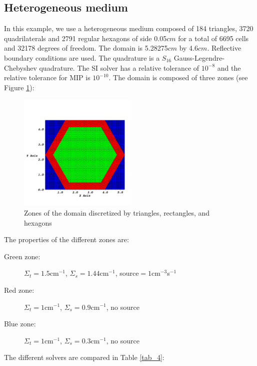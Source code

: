 \subsection{Heterogeneous medium}
In this example, we use a heterogeneous medium composed of 184 triangles, 3720
quadrilaterals and 2791 regular hexagons of side 0.05$cm$ for a total of 6695 
cells and 32178 degrees of freedom. The domain is 5.28275$cm$ by 4.6$cm$. 
Reflective boundary conditions are used. The quadrature is a $S_{16}$ 
Gauss-Legendre-Chebyshev quadrature. The SI solver has a relative tolerance of 
$10^{-8}$ and the relative tolerance for MIP is $10^{-10}$. The domain is 
composed of three zones (see Figure \ref{fig_zone_hex}):
\begin{figure}[H]
  \centering
  \includegraphics[width=0.5\textwidth]{./Dsa/source_crop}
  \caption{Zones of the domain discretized by triangles, rectangles, and
  hexagons}
  \label{fig_zone_hex}
\end{figure}
The properties of the different zones are:
\begin{description}
  \item[Green zone:] $\Sigma_t =1.5$cm$^{-1}$, $\Sigma_s = 1.44$cm$^{-1}$, source$ =
    1$cm$^{-3}$s$^{-1}$
  \item[Red zone:] $\Sigma_t = 1$cm$^{-1}$, $\Sigma_s = 0.9$cm$^{-1}$, no source
  \item[Blue zone:] $\Sigma_t = 1$cm$^{-1}$, $\Sigma_s = 0.3$cm$^{-1}$, no source
\end{description}
The different solvers are compared in Table \ref{tab_4}:
